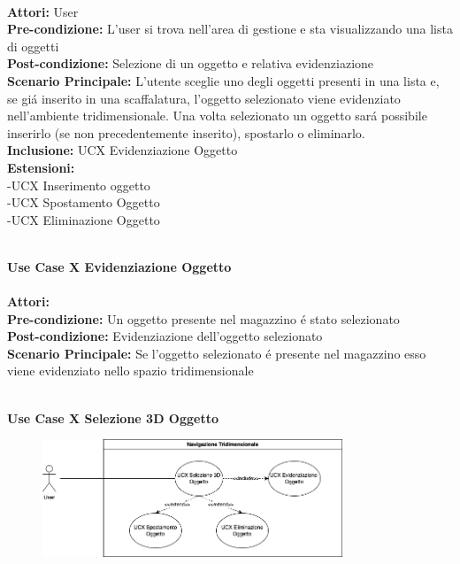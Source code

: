 \vspace{0.5cm}

\large\textbf{} \\
\textbf{Attori:} User\\
\textbf{Pre-condizione:} L'user si trova nell'area di gestione e sta visualizzando una lista di oggetti \\
\textbf{Post-condizione: } Selezione di un oggetto e relativa evidenziazione\\
\textbf{Scenario Principale:}  L'utente sceglie uno degli oggetti presenti in una lista e, se giá inserito in una scaffalatura, l'oggetto selezionato viene evidenziato nell'ambiente tridimensionale. Una volta selezionato un oggetto sará possibile inserirlo (se non precedentemente inserito), spostarlo o eliminarlo.\\
\textbf{Inclusione:} UCX Evidenziazione Oggetto \\
\textbf{Estensioni:} \\ 
-UCX Inserimento oggetto \\ -UCX Spostamento Oggetto \\ -UCX Eliminazione Oggetto

\vspace{0.5cm}

\Large\textbf{}\\
\Large\textbf{Use Case X Evidenziazione Oggetto} \\

\large\textbf{} \\
\textbf{Attori:}\\
\textbf{Pre-condizione:} Un oggetto presente nel magazzino é stato selezionato \\
\textbf{Post-condizione: } Evidenziazione dell'oggetto selezionato \\
\textbf{Scenario Principale:}  Se l'oggetto selezionato é presente nel magazzino esso viene evidenziato nello spazio tridimensionale\\

\vspace{0.5cm}
\newpage

\Large\textbf{}\\
\Large\textbf{Use Case X Selezione 3D Oggetto} \\
\begin{figure}[h]
  \centering
  \includegraphics[width=0.8\textwidth]{UseCasesImages/3DSel.png}
\end{figure}

